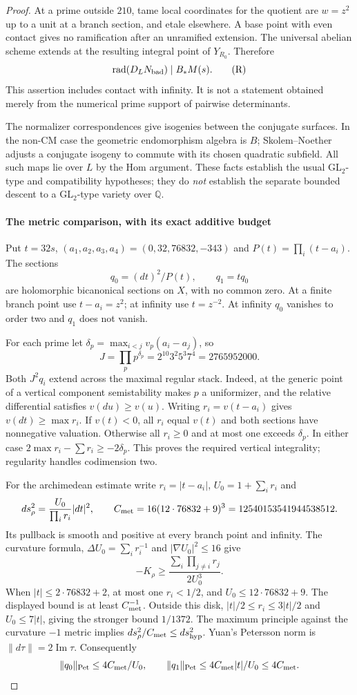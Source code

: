 \documentclass[11pt]{article}
\theoremstyle{definition}
\theoremstyle{remark}
\begin{document}
\begin{proof}
At a prime outside $210$, tame local coordinates for the quotient are
$w=z^2$ up to a unit at a branch section, and etale elsewhere. A base
point with even contact gives no ramification after an unramified
extension. The universal abelian scheme extends at the resulting
integral point of $Y_{R_0}$. Therefore
\[
 \operatorname{rad}(D_LN_{\rm bad})\mid B_*M(s).
\tag{R}\label{eq:h5-R}
\]
This assertion includes contact with infinity. It is not a statement
obtained merely from the numerical prime support of pairwise determinants.

The normalizer correspondences give isogenies between the conjugate
surfaces. In the non-CM case the geometric endomorphism algebra is $B$;
Skolem--Noether adjusts a conjugate isogeny to commute with its chosen
quadratic subfield. All such maps lie over $L$ by the Hom argument.
These facts establish the usual GL$_2$-type and compatibility hypotheses;
they do \emph{not} establish the separate bounded descent to a
GL$_2$-type variety over $\mathbb Q$.

\paragraph{The metric comparison, with its exact additive budget}
Put $t=32s$, $(a_1,a_2,a_3,a_4)=(0,32,76832,-343)$ and
$P(t)=\prod_i(t-a_i)$. The sections
\[
 q_0=(dt)^2/P(t),\qquad q_1=tq_0
\]
are holomorphic bicanonical sections on $X$, with no common zero. At a
finite branch point use $t-a_i=z^2$; at infinity use $t=z^{-2}$.
At infinity $q_0$ vanishes to order two and $q_1$ does not vanish.

For each prime let $\delta_p=\max_{i<j}v_p(a_i-a_j)$, so
\[
 J=\prod_p p^{\delta_p}=2^{10}3^2 5^3 7^4=2765952000.
\]
Both $J^2q_i$ extend across the maximal regular stack. Indeed, at the
generic point of a vertical component semistability makes $p$ a
uniformizer, and the relative differential satisfies $v(du)\ge v(u)$.
Writing $r_i=v(t-a_i)$ gives $v(dt)\ge\max r_i$. If $v(t)<0$, all $r_i$
equal $v(t)$ and both sections have nonnegative valuation. Otherwise all
$r_i\ge0$ and at most one exceeds $\delta_p$. In either case
$2\max r_i-\sum r_i\ge-2\delta_p$. This proves the required vertical
integrality; regularity handles codimension two.

For the archimedean estimate write $r_i=|t-a_i|$, $U_0=1+\sum_i r_i$ and
\[
 ds_\rho^2=\frac{U_0}{\prod_i r_i}|dt|^2,\qquad
 C_{\rm met}=16(12\cdot76832+9)^3=12540153541944538512.
\]
Its pullback is smooth and positive at every branch point and infinity.
The curvature formula, $\Delta U_0=\sum_i r_i^{-1}$ and
$|\nabla U_0|^2\le16$ give
\[
 -K_\rho\ge\frac{\sum_i\prod_{j\ne i}r_j}{2U_0^3}.
\]
When $|t|\le2\cdot76832+2$, at most one $r_i<1/2$, and
$U_0\le12\cdot76832+9$. The displayed bound is at least
$C_{\rm met}^{-1}$. Outside this disk, $|t|/2\le r_i\le3|t|/2$
and $U_0\le7|t|$, giving the stronger bound $1/1372$.
The maximum principle against the curvature $-1$ metric implies
$ds_\rho^2/C_{\rm met}\le ds_{\rm hyp}^2$. Yuan's Petersson norm is
$\|d\tau\|=2\operatorname{Im}\tau$. Consequently
\[
 \|q_0\|_{\rm Pet}\le4C_{\rm met}/U_0,\qquad
 \|q_1\|_{\rm Pet}\le4C_{\rm met}|t|/U_0\le4C_{\rm met}.
\]


\end{proof}
\end{document}
